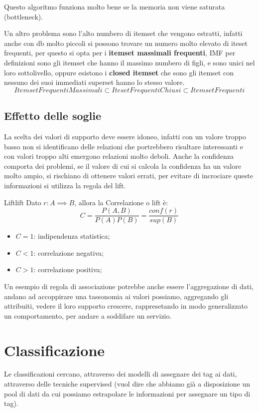 \documentclass[12pt]{article}
\begin{document}
Questo algoritmo funziona molto bene se la memoria non viene saturata (bottleneck).

Un altro problema sono l'alto numbero di itemset che vengono estratti, infatti anche con db molto piccoli si possono trovare un numero molto elevato di iteset frequenti, per questo si opta per i \textbf{itemset massimali frequenti}, IMF per definizioni sono gli itemset che hanno il massimo numbero di figli, e sono unici nel loro sottolivello, oppure esistono i \textbf{closed itemset} che sono gli itemset con nessuno dei suoi immediati superset hanno lo stesso valore.
\[ ItemsetFrequentiMassimali \subset ItesetFrequentiChiusi \subset ItemsetFrequenti \]

\subsection{Effetto delle soglie}
La scelta dei valori di supporto deve essere idoneo, infatti con un valore troppo basso non si identificano delle relazioni che portrebbero risultare interessanti e con valori troppo alti emergono relazioni molto deboli. Anche la confidenza comporta dei problemi, se il valore di cui si calcola la confidenza ha un valore molto ampio, si rischiano di ottenere valori errati, per evitare di incrociare queste informazioni si utilizza la regola del lift.
\begin{definition}{Lift}{lift}
    Dato $ r: A \implies B $, allora la Correlazione o lift \`e:
    \[ C = \frac{P(A,B)}{P(A)P(B)} = \frac{conf(r)}{sup(B)} \]
    \begin{itemize}
        \item $C = 1$: indipendenza statistica;
        \item $C < 1$: correlazione negativa;
        \item $C > 1$: correlazione positiva;
    \end{itemize}
\end{definition}


Un esempio di regola di associazione potrebbe anche essere l'aggregazione di dati, andano ad accoppirare una tassonomia ai valori possiamo, aggregando gli attribuiti, vedere il loro supporto crescere, rappresetando in modo generalizzato un comportamento, per andare a soddifare un servizio.


\newpage
\section{Classificazione}
Le classificazioni cercano, attraverso dei modelli di assegnare dei tag ai dati, attraverso delle tecniche supervised (vuol dire che abbiamo gi\`a a disposizione un pool di dati da cui possiamo estrapolare le informazioni per assegnare un tipo di tag).
\end{document}
